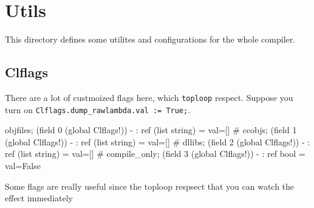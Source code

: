 \section{Utils}
This directory defines some utilites and configurations for the whole
compiler.

\subsection{Clflags}

There are a lot of custmoized flags here, which \verb|toploop|
respect.  Suppose you turn on
\verb|Clflags.dump_rawlambda.val := True;|.


\begin{ocamlcode}
objfiles;
(field 0 (global Clflags!))
- : ref (list string) = {val=[]}
# ccobjs;
(field 1 (global Clflags!))
- : ref (list string) = {val=[]}
# dllibs;
(field 2 (global Clflags!))
- : ref (list string) = {val=[]}
# compile_only;
(field 3 (global Clflags!))
- : ref bool = {val=False}
\end{ocamlcode}


Some flags are really useful since the toploop respsect that you can
watch the effect immediately

